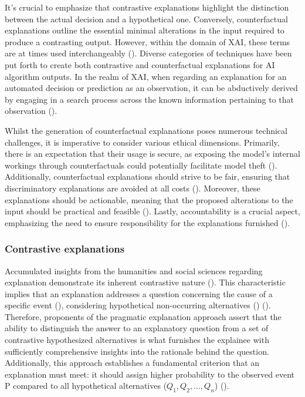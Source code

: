 \documentclass[binding=0.6cm]{sapthesis}
\newcommand{\mycite}[1]{(\cite{#1})}
\begin{document}
It's crucial to emphasize that contrastive explanations highlight the distinction between the actual decision and a hypothetical one. Conversely, counterfactual explanations outline the essential minimal alterations in the input required to produce a contrasting output. However, within the domain of XAI, these terms are at times used interchangeably \mycite{thai2020-grace,poyiadzi2020-face}. Diverse categories of techniques have been put forth to create both contrastive and counterfactual explanations for AI algorithm outputs. In the realm of XAI, when regarding an explanation for an automated decision or prediction as an observation, it can be abductively derived by engaging in a search process across the known information pertaining to that observation \mycite{bergadano2000-abduction}.

Whilst the generation of counterfactual explanations poses numerous technical challenges, it is imperative to consider various ethical dimensions. Primarily, there is an expectation that their usage is secure, as exposing the model's internal workings through counterfactuals could potentially facilitate model theft \mycite{sokol2019-counterfactualEO}. Additionally, counterfactual explanations should strive to be fair, ensuring that discriminatory explanations are avoided at all costs \mycite{kusner2018-counterfactual}. Moreover, these explanations should be actionable, meaning that the proposed alterations to the input should be practical and feasible \mycite{lucic2020-model-fail}. Lastly, accountability is a crucial aspect, emphasizing the need to ensure responsibility for the explanations furnished \mycite{arrieta2020-taxo-xai}.


\subsubsection{Contrastive explanations}
\label{sec:bg.xai.contrastive}
Accumulated insights from the humanities and social sciences regarding explanation demonstrate its inherent contrastive nature \mycite{miller2019-xai-insights}. This characteristic implies that an explanation addresses a  question concerning the cause of a specific event (), considering hypothetical non-occurring alternatives () \mycite{lipton1990-LIPCE}. Therefore, proponents of the pragmatic explanation approach assert that the ability to distinguish the answer to an explanatory question from a set of contrastive hypothesized alternatives is what furnishes the explainee with sufficiently comprehensive insights into the rationale behind the question. Additionally, this approach establishes a fundamental criterion that an explanation must meet: it should assign higher probability to the observed event P compared to all hypothetical alternatives ($Q_1, Q_2, ..., Q_n$) \mycite{sormo2005-cased-based}.
\end{document}
